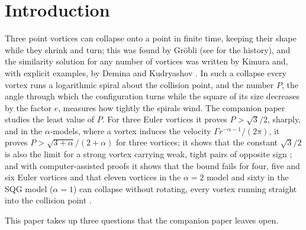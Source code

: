 \documentclass[11pt]{article}
\theoremstyle{definition}
\begin{document}
\begin{abstract}
\medskip
\noindent\textbf{Keywords:} point vortices; vortex collapse; self-similar motion; relative equilibria; surface quasi-geostrophic equation; vortex sheet.\\
\textbf{MSC 2020:} 76B47, 37N10, 76U60.
\end{abstract}

\section{Introduction}

Three point vortices can collapse onto a point in finite time, keeping their shape while they shrink and turn; this was found by Gr\"obli (see \cite[p.~17, Fig.~3]{art1992} for the history), and the similarity solution for any number of vortices was written by Kimura \cite[Sect.~3.1]{kimura1987} and, with explicit examples, by Demina and Kudryashov \cite{dk2014}. In such a collapse every vortex runs a logarithmic spiral about the collision point, and the number $P$, the angle through which the configuration turns while the square of its size decreases by the factor $e$, measures how tightly the spirals wind. The companion paper \cite{mw2026} studies the least value of $P$. For three Euler vortices it proves $P > \sqrt{3}/2$, sharply, and in the $\alpha$-models, where a vortex induces the velocity $\Gamma r^{-\alpha-1}/(2\pi)$, it proves $P > \sqrt{3 + \alpha}/(2 + \alpha)$ for three vortices; it shows that the constant $\sqrt{3}/2$ is also the limit for a strong vortex carrying weak, tight pairs of opposite sign \cite[Theorem~3]{mw2026}; and with computer-assisted proofs it shows that the bound fails for four, five and six Euler vortices and that eleven vortices in the $\alpha = 2$ model and sixty in the SQG model ($\alpha = 1$) can collapse without rotating, every vortex running straight into the collision point \cite[Theorems~4, 5]{mw2026}.

This paper takes up three questions that the companion paper leaves open.
\end{document}
